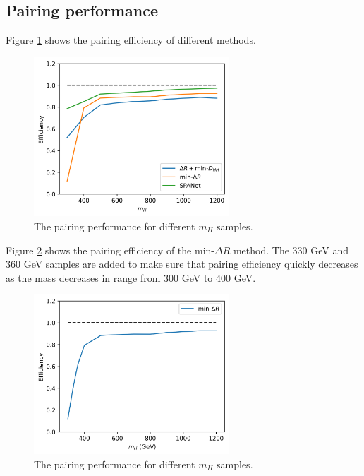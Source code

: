 \documentclass[12pt]{article}
\begin{document}
	\subsection{Pairing performance}%
	\label{sub:pairing_performance}
		
		Figure \ref{fig:pairing_performance_mass} shows the pairing efficiency of different methods.
		\begin{figure}[htpb]
			\centering
			\includegraphics[width=0.65\textwidth]{pairing_efficiency_resonant-DHH-mindR-SPANet2.png}
			\caption{The pairing performance for different $m_H$ samples.}
			\label{fig:pairing_performance_mass}
		\end{figure}

		Figure \ref{fig:pairing_performance_mass_mindr} shows the pairing efficiency of the $\text{min-}\Delta R$ method. The 330 GeV and 360 GeV samples are added to make sure that pairing efficiency quickly decreases as the mass decreases in range from 300 GeV to 400 GeV.
		\begin{figure}[htpb]
			\centering
			\includegraphics[width=0.65\textwidth]{pairing_efficiency_resonant-mindR.png}
			\caption{The pairing performance for different $m_H$ samples.}
			\label{fig:pairing_performance_mass_mindr}
		\end{figure}
\end{document}
